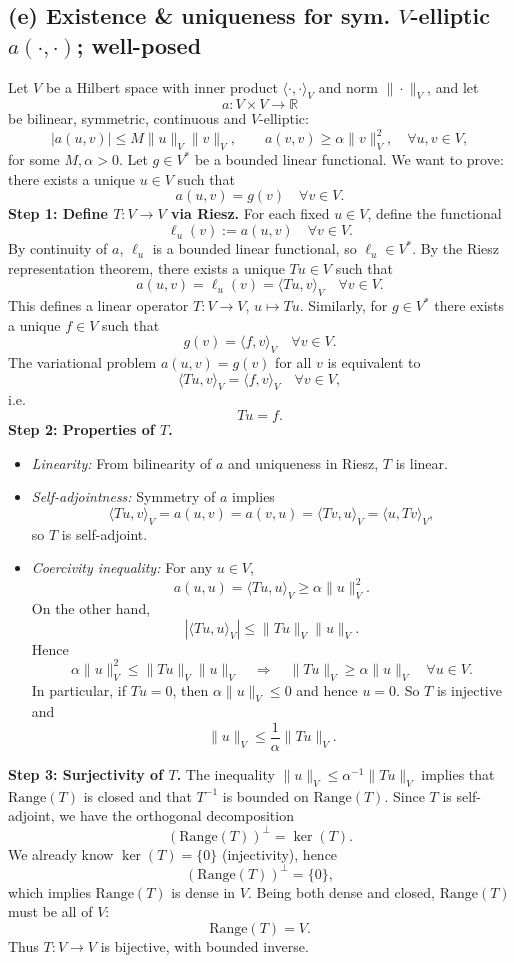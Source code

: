 \subsection*{(e) Existence \& uniqueness for sym. $V$-elliptic $a(\cdot, \cdot)$; well-posed}
Let $V$ be a Hilbert space with inner product $\langle\cdot,\cdot\rangle_V$ and norm $\|\cdot\|_V$, and let
\[
    a:V\times V \to \mathbb{R}
\]
be bilinear, symmetric, continuous and $V$-elliptic:
\[
    |a(u,v)| \le M \|u\|_V \|v\|_V,\qquad
    a(v,v) \ge \alpha \|v\|_V^2,\quad \forall u,v\in V,
\]
for some $M,\alpha>0$.
Let $g \in V^\ast$ be a bounded linear functional.
We want to prove: there exists a unique $u \in V$ such that
\[
    a(u,v) = g(v) \quad \forall v \in V.
\]
\textbf{Step 1: Define $T:V\to V$ via Riesz.}
For each fixed $u\in V$, define the functional
\[
    \ell_u(v) := a(u,v) \quad \forall v\in V.
\]
By continuity of $a$, $\ell_u$ is a bounded linear functional, so $\ell_u\in V^\ast$.
By the Riesz representation theorem, there exists a unique $T u \in V$ such that
\[
    a(u,v) = \ell_u(v) = \langle T u, v\rangle_V \quad \forall v\in V.
\]
This defines a linear operator $T:V\to V$, $u\mapsto T u$.
Similarly, for $g\in V^\ast$ there exists a unique $f\in V$ such that
\[
    g(v) = \langle f,v\rangle_V \quad \forall v\in V.
\]
The variational problem $a(u,v)=g(v)$ for all $v$ is equivalent to
\[
    \langle T u, v\rangle_V = \langle f,v\rangle_V \quad\forall v\in V,
\]
i.e.
\[
    T u = f.
\]
\textbf{Step 2: Properties of $T$.}
\begin{itemize}
    \item \emph{Linearity:} From bilinearity of $a$ and uniqueness in Riesz, $T$ is linear.
    \item \emph{Self-adjointness:} Symmetry of $a$ implies
          \[
              \langle T u, v\rangle_V = a(u,v) = a(v,u) = \langle T v, u\rangle_V = \langle u, T v\rangle_V,
          \]
          so $T$ is self-adjoint.
    \item \emph{Coercivity inequality:} For any $u\in V$,
          \[
              a(u,u) = \langle T u, u\rangle_V \ge \alpha \|u\|_V^2.
          \]
          On the other hand,
          \[
              |\langle T u, u\rangle_V| \le \|T u\|_V\|u\|_V.
          \]
          Hence
          \[
              \alpha \|u\|_V^2 \le \|T u\|_V\|u\|_V
              \quad\Rightarrow\quad
              \|T u\|_V \ge \alpha \|u\|_V \quad \forall u\in V.
          \]
          In particular, if $T u = 0$, then $\alpha \|u\|_V \le 0$ and hence $u=0$. So $T$ is injective and
          \[
              \|u\|_V \le \frac{1}{\alpha}\|T u\|_V.
          \]
\end{itemize}
\textbf{Step 3: Surjectivity of $T$.}
The inequality $\|u\|_V \le \alpha^{-1}\|T u\|_V$ implies that $\mathrm{Range}(T)$ is closed and that $T^{-1}$ is bounded on $\mathrm{Range}(T)$.
Since $T$ is self-adjoint, we have the orthogonal decomposition
\[
    (\mathrm{Range}(T))^\perp = \ker(T).
\]
We already know $\ker(T) = \{0\}$ (injectivity), hence
\[
    (\mathrm{Range}(T))^\perp = \{0\},
\]
which implies $\mathrm{Range}(T)$ is dense in $V$. Being both dense and closed, $\mathrm{Range}(T)$ must be all of $V$:
\[
    \mathrm{Range}(T) = V.
\]
Thus $T:V\to V$ is bijective, with bounded inverse.

